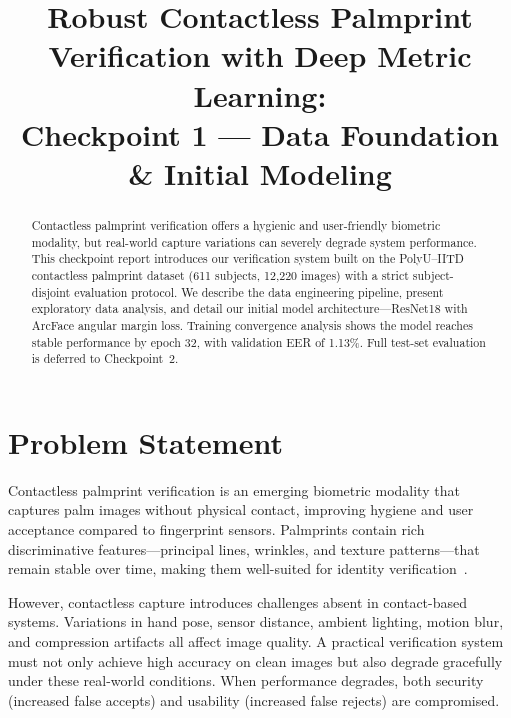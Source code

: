 \documentclass[conference]{IEEEtran}
\begin{document}
\title{Robust Contactless Palmprint Verification with Deep Metric Learning:\\Checkpoint 1 --- Data Foundation \& Initial Modeling}

\author{
}

\maketitle

\begin{abstract}
Contactless palmprint verification offers a hygienic and user-friendly biometric modality, but real-world capture variations can severely degrade system performance. This checkpoint report introduces our verification system built on the PolyU--IITD contactless palmprint dataset (611 subjects, 12,220 images) with a strict subject-disjoint evaluation protocol. We describe the data engineering pipeline, present exploratory data analysis, and detail our initial model architecture---ResNet18 with ArcFace angular margin loss. Training convergence analysis shows the model reaches stable performance by epoch 32, with validation EER of 1.13\%. Full test-set evaluation is deferred to Checkpoint~2.
\end{abstract}

\section{Problem Statement}

Contactless palmprint verification is an emerging biometric modality that captures palm images without physical contact, improving hygiene and user acceptance compared to fingerprint sensors. Palmprints contain rich discriminative features---principal lines, wrinkles, and texture patterns---that remain stable over time, making them well-suited for identity verification~\cite{zhong2019palmprint, zhang2003palmcode}.

However, contactless capture introduces challenges absent in contact-based systems. Variations in hand pose, sensor distance, ambient lighting, motion blur, and compression artifacts all affect image quality. A practical verification system must not only achieve high accuracy on clean images but also degrade gracefully under these real-world conditions. When performance degrades, both security (increased false accepts) and usability (increased false rejects) are compromised.
\end{document}
